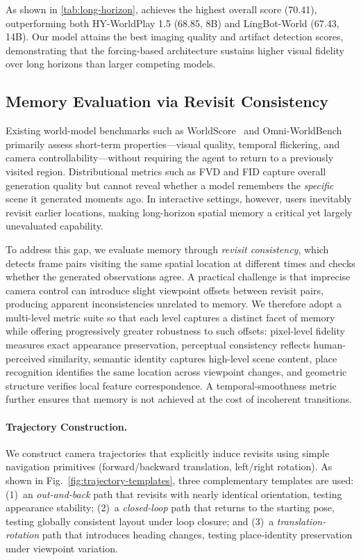 As shown in \cref{tab:long-horizon}, \evalmodel{} achieves the highest overall score (70.41), outperforming both HY-WorldPlay 1.5 (68.85, 8B) and LingBot-World (67.43, 14B). Our model attains the best imaging quality and artifact detection scores, demonstrating that the forcing-based architecture sustains higher visual fidelity over long horizons than larger competing models.

\subsection{Memory Evaluation via Revisit Consistency}
\label{sec:memory-eval}

Existing world-model benchmarks such as WorldScore~\citep{duan2025worldscore}
and Omni-WorldBench~\citep{wu2026omniworldbench}
primarily assess short-term properties---visual quality, temporal flickering,
and camera controllability---without requiring the agent
to return to a previously visited region.
Distributional metrics such as FVD and FID capture overall generation quality
but cannot reveal whether a model remembers
the \emph{specific} scene it generated moments ago.
In interactive settings, however, users inevitably revisit earlier locations,
making long-horizon spatial memory a critical yet largely unevaluated capability.

To address this gap, we evaluate memory through \emph{revisit consistency},
which detects frame pairs visiting the same spatial location
at different times and checks whether the generated observations agree.
A practical challenge is that imprecise camera control
can introduce slight viewpoint offsets between revisit pairs,
producing apparent inconsistencies unrelated to memory.
We therefore adopt a multi-level metric suite
so that each level captures a distinct facet of memory
while offering progressively greater robustness to such offsets:
pixel-level fidelity measures exact appearance preservation,
perceptual consistency reflects human-perceived similarity,
semantic identity captures high-level scene content,
place recognition identifies the same location across viewpoint changes,
and geometric structure verifies local feature correspondence.
A temporal-smoothness metric further ensures
that memory is not achieved at the cost of incoherent transitions.

\paragraph{\bf{Trajectory Construction.}}
We construct camera trajectories that explicitly induce revisits
using simple navigation primitives
(forward/backward translation, left/right rotation).
As shown in Fig.~\ref{fig:trajectory-templates},
three complementary templates are used:
(1)~an \emph{out-and-back} path that revisits with nearly identical orientation,
testing appearance stability;
(2)~a \emph{closed-loop} path that returns to the starting pose,
testing globally consistent layout under loop closure;
and (3)~a \emph{translation-rotation} path that introduces heading changes,
testing place-identity preservation under viewpoint variation.

